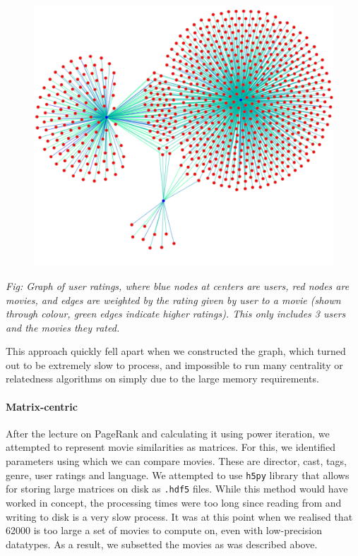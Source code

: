 \documentclass[11pt]{article}
\begin{document}
\begin{figure}
\centering
    \includegraphics[]{graph.png}
\end{figure}
\begin{center}
    \textit{Fig: Graph of user ratings, where blue nodes at centers are users, red nodes are movies, and edges are weighted by the rating given by user to a movie (shown through colour, green edges indicate higher ratings). This only includes 3 users and the movies they rated.}
\end{center}
This approach quickly fell apart when we constructed the graph, which
turned out to be extremely slow to process, and impossible to run many
centrality or relatedness algorithms on simply due to the large memory
requirements.

\hypertarget{matrix-centric}{%
\paragraph{Matrix-centric}\label{matrix-centric}}

After the lecture on PageRank and calculating it using power iteration,
we attempted to represent movie similarities as matrices. For this, we
identified parameters using which we can compare movies. These are
director, cast, tags, genre, user ratings and language. We attempted to
use \texttt{h5py} library that allows for storing large matrices on disk
as \texttt{.hdf5} files. While this method would have worked in concept,
the processing times were too long since reading from and writing to
disk is a very slow process. It was at this point when we realised that
62000 is too large a set of movies to compute on, even with
low-precision datatypes. As a result, we subsetted the movies as was
described above.
\end{document}
